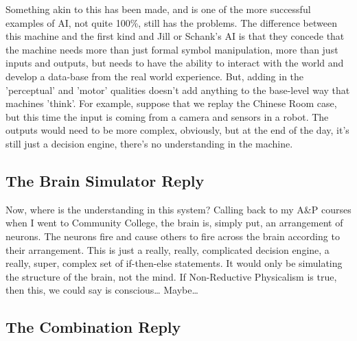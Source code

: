     Something akin to this has been made, and is one of the more successful examples of AI, not quite 100\%, still has the problems. The difference between this machine and the first kind and Jill or Schank's AI is that they concede that the machine needs more than just formal symbol manipulation, more than just inputs and outputs, but needs to have the ability to interact with the world and develop a data-base from the real world experience. But, adding in the 'perceptual' and 'motor' qualities doesn't add anything to the base-level way that machines 'think'. For example, suppose that we replay the Chinese Room case, but this time the input is coming from a camera and sensors in a robot. The outputs would need to be more complex, obviously, but at the end of the day, it's still just a decision engine, there's no understanding in the machine.
    \subsection{The Brain Simulator Reply}


    Now, where is the understanding in this system? Calling back to my A\&P courses when I went to Community College, the brain is, simply put, an arrangement of neurons. The neurons fire and cause others to fire across the brain according to their arrangement. This is just a really, really, complicated decision engine, a really, super, complex set of if-then-else statements.  It would only be simulating the structure of the brain, not the mind. If Non-Reductive Physicalism is true, then this, we could say is conscious… Maybe…
\subsection{The Combination Reply}


